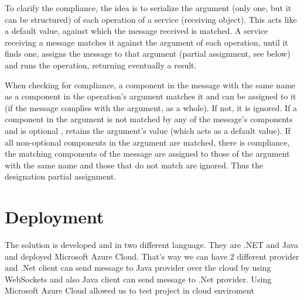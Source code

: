 To clarify the compliance, the idea is to serialize the argument (only one, but it can be structured) of each operation of a service
(receiving object). This acts like a default value, against which the message received is matched. A service receiving a message matches
it against the argument of each operation, until it finds one, assigns the message to that argument (partial assignment, see below) and
runs the operation, returning eventually a result.


When checking for compliance, a component in the message with the same name as a component in the operation’s argument matches it and
can be assigned to it (if the message complies with the argument, as a whole). If not, it is ignored. If a component in the argument
is not matched by any of the message’s components and is optional , retains the argument’s value (which acts as a default value).
If all non-optional  components in the argument are matched, there is compliance, the matching components of the message are
assigned to those of the argument with the same name and those that do not match are ignored. Thus the designation partial assignment.


\section{Deployment}
\label{section:deployment}

The solution is developed and in two different language. They are .NET and Java and deployed Microsoft Azure Cloud. That's way we can
have 2 different provider and .Net client can send message to Java provider over the cloud by using WebSockets and also Java client can
send message to .Net provider. Using Microsoft Azure Cloud allowed us to test project in cloud enviroment
